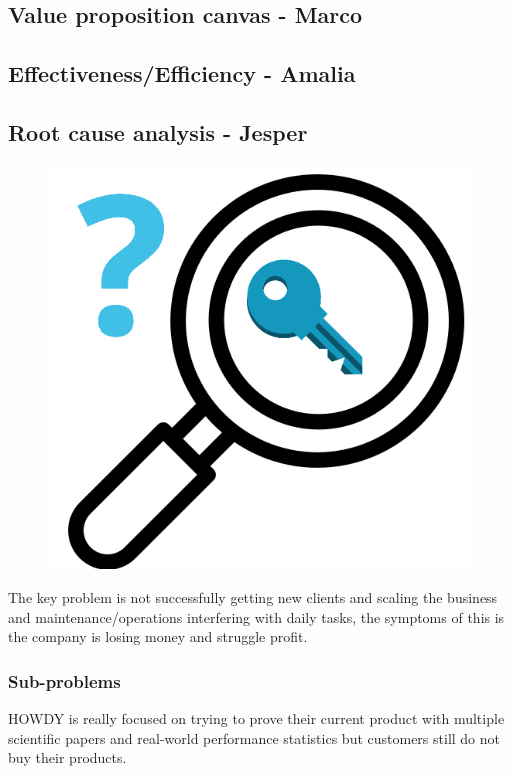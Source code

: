 \subsection{Value proposition canvas - Marco}

\subsection{Effectiveness/Efficiency - Amalia }

\subsection{Root cause analysis - Jesper}


\begin{figure}
\centering
\includegraphics[scale=0.15]{figures/keyproblem.png}
\end{figure}

The key problem is not successfully getting new clients and scaling the business and maintenance/operations interfering with daily tasks, the symptoms of this is the company is losing money and struggle profit.

\subsubsection{Sub-problems}
HOWDY is really focused on trying to prove their current product with multiple scientific papers and real-world performance statistics but customers still do not buy their products. 


